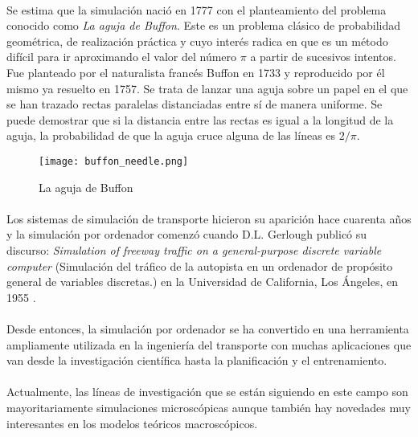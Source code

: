 	\paragraph{}
	Se estima que la simulación nació en 1777 con el planteamiento del problema conocido como \emph{La aguja de Buffon}. Este es un problema clásico de probabilidad geométrica, de realización práctica y cuyo interés radica en que es un método difícil para ir aproximando el valor del número $\pi$ a partir de sucesivos intentos. Fue planteado por el naturalista francés Buffon en 1733 y reproducido por él mismo ya resuelto en 1757. Se trata de lanzar una aguja sobre un papel en el que se han trazado rectas paralelas distanciadas entre sí de manera uniforme. Se puede demostrar que si la distancia entre las rectas es igual a la longitud de la aguja, la probabilidad de que la aguja cruce alguna de las líneas es $2/\pi$.
	
	\begin{figure}[ht]
		\centering
			\texttt{[image: buffon\_needle.png]}
		\caption{La aguja de Buffon}
		\label{fig:AgujaBuffon}
	\end{figure}
	
	\paragraph{}	
	Los sistemas de simulación de transporte hicieron su aparición hace cuarenta años y la simulación por ordenador comenzó cuando D.L. Gerlough publicó su discurso: \emph{Simulation of freeway traffic on a general-purpose discrete variable computer} (Simulación del tráfico de la autopista en un ordenador de propósito general de variables discretas.) en la Universidad de California, Los Ángeles, en 1955 \cite{Kallberg1971}.
	
	\paragraph{}
	Desde entonces, la simulación por ordenador se ha convertido en una herramienta ampliamente utilizada en la ingeniería del transporte con muchas aplicaciones que van desde la investigación científica hasta la planificación y el entrenamiento.
	
	
	\paragraph{}
	Actualmente, las líneas de investigación que se están siguiendo en este campo son mayoritariamente simulaciones microscópicas aunque también hay novedades muy interesantes en los modelos teóricos macroscópicos.
	
